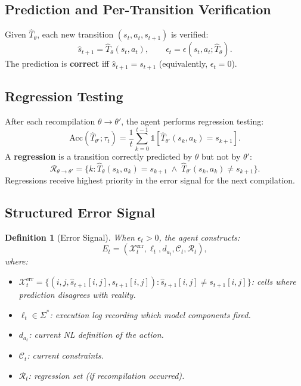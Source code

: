 \documentclass{article}
\newtheorem{definition}{Definition}
\newcommand{\calC}{\mathcal{C}}
\newcommand{\calR}{\mathcal{R}}
\newcommand{\calX}{\mathcal{X}}
\newcommand{\ind}{\mathbb{1}}
\begin{document}
\subsection{Prediction and Per-Transition Verification}
\label{sec:predict_verify}

Given $\hat{T}_\theta$, each new transition $(s_t, a_t, s_{t+1})$ is verified:
\begin{equation}
\hat{s}_{t+1} = \hat{T}_\theta(s_t, a_t), \qquad \epsilon_t = \epsilon(s_t, a_t; \hat{T}_\theta).
\end{equation}
The prediction is \textbf{correct} iff $\hat{s}_{t+1} = s_{t+1}$ (equivalently, $\epsilon_t = 0$).

\subsection{Regression Testing}
\label{sec:regression}

After each recompilation $\theta \to \theta'$, the agent performs regression testing:
\begin{equation}
\text{Acc}(\hat{T}_{\theta'}; \tau_t) = \frac{1}{t} \sum_{k=0}^{t-1} \ind[\hat{T}_{\theta'}(s_k, a_k) = s_{k+1}].
\end{equation}
A \textbf{regression} is a transition correctly predicted by $\theta$ but not by $\theta'$:
\begin{equation}
\calR_{\theta \to \theta'} = \{k : \hat{T}_\theta(s_k, a_k) = s_{k+1} \;\wedge\; \hat{T}_{\theta'}(s_k, a_k) \neq s_{k+1}\}.
\end{equation}
Regressions receive highest priority in the error signal for the next compilation.

\subsection{Structured Error Signal}
\label{sec:error_signal}

\begin{definition}[Error Signal]
\label{def:error_signal}
When $\epsilon_t > 0$, the agent constructs:
\begin{equation}
E_t = (\calX_t^{\text{err}}, \ell_t, d_{a_t}, \calC_t, \calR_t),
\end{equation}
where:
\begin{itemize}[nosep]
    \item $\calX_t^{\text{err}} = \{(i,j, \hat{s}_{t+1}[i,j], s_{t+1}[i,j]) : \hat{s}_{t+1}[i,j] \neq s_{t+1}[i,j]\}$: cells where prediction disagrees with reality.
    \item $\ell_t \in \Sigma^*$: execution log recording which model components fired.
    \item $d_{a_t}$: current NL definition of the action.
    \item $\calC_t$: current constraints.
    \item $\calR_t$: regression set (if recompilation occurred).
\end{itemize}
\end{definition}
\end{document}
